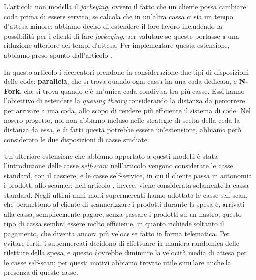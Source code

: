 L'articolo \cite{article1} non modella il \textit{jockeying}, ovvero il fatto che un cliente possa cambiare coda prima di essere servito, se calcola che in un'altra cassa ci sia un tempo d'attesa minore; abbiamo deciso di estendere il loro lavoro includendo la possibilità per i clienti di fare \textit{jockeying}, per valutare se questo portasse a una riduzione ulteriore dei tempi d'attesa. Per implementare questa estensione, abbiamo preso spunto dall'articolo \cite{yanagisawa2011methods}.

In questo articolo i ricercatori prendono in considerazione due tipi di disposizioni delle code: \textbf{parallela}, che si trova quando ogni cassa ha una coda dedicata, e \textbf{N-Fork}, che si trova quando c'è un'unica coda condivisa tra più casse. Essi hanno l'obiettivo di estendere la \textit{queuing theory} considerando la distanza da percorrere per arrivare a una coda, allo scopo di rendere più efficiente il sistema di code. Nel nostro progetto, noi non abbiamo incluso nelle strategie di scelta della coda la distanza da essa, e di fatti questa potrebbe essere un'estensione, abbiamo però considerato le due disposizioni di casse studiate.

Un'ulteriore estensione che abbiamo apportato a questi modelli è stata l'introduzione delle casse \textit{self-scan}: nell'articolo \cite{article1} vengono considerate le casse standard, con il cassiere, e le casse self-service, in cui il cliente passa in autonomia i prodotti allo scanner; nell'articolo \cite{yanagisawa2011methods}, invece, viene considerata solamente la cassa standard. Negli ultimi anni molti supermercati hanno adottato le casse self-scan, che permettono al cliente di scannerizzare i prodotti durante la spesa e, arrivati alla cassa, semplicemente pagare, senza passare i prodotti su un nastro; questo tipo di cassa sembra essere molto efficiente, in quanto richiede soltanto il pagamento, che diventa ancora più veloce se fatto in forma telematica. Per evitare furti, i supermercati decidono di effettuare in maniera randomica delle riletture della spesa, e questo dovrebbe diminuire la velocità media di attesa per le casse self-scan; per questi motivi abbiamo trovato utile simulare anche la presenza di queste casse.

